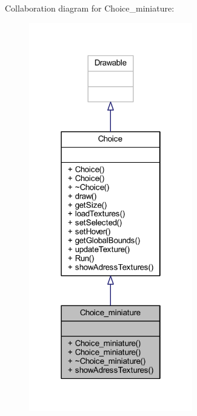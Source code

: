 Collaboration diagram for Choice\+\_\+miniature\+:
\nopagebreak
\begin{figure}[H]
\begin{center}
\leavevmode
\includegraphics[width=202pt]{class_choice__miniature__coll__graph}
\end{center}
\end{figure}
